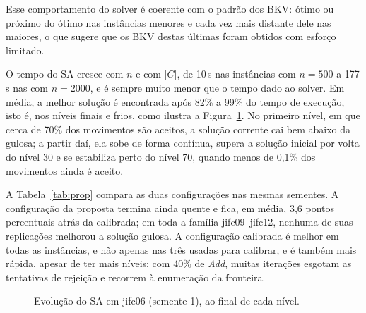 \documentclass[11pt,a4paper]{article}
\begin{document}
Esse comportamento do solver é coerente com o padrão dos BKV: ótimo ou
próximo do ótimo nas instâncias menores e cada vez mais distante dele nas
maiores, o que sugere que os BKV destas últimas foram obtidos com esforço
limitado.

O tempo do SA cresce com $n$ e com $|C|$, de 10\,s nas instâncias com
$n=500$ a 177\,s nas com $n=2000$, e é sempre muito menor que o tempo dado ao
solver. Em média, a melhor solução é encontrada após 82\% a 99\% do tempo de
execução, isto é, nos níveis finais e frios, como ilustra a
Figura~\ref{fig:conv}. No primeiro nível, em que cerca de 70\% dos movimentos
são aceitos, a solução corrente cai bem abaixo da gulosa; a partir daí, ela
sobe de forma contínua, supera a solução inicial por volta do nível 30 e se
estabiliza perto do nível 70, quando menos de 0{,}1\% dos movimentos ainda é
aceito.

A Tabela~\ref{tab:prop} compara as duas configurações nas mesmas sementes.
A configuração da proposta termina ainda quente e fica, em média, 3{,}6 pontos
percentuais atrás da calibrada; em toda a família jifc09--jifc12, nenhuma de
suas replicações melhorou a solução gulosa. A configuração calibrada é melhor
em todas as instâncias, e não apenas nas três usadas para calibrar, e é também
mais rápida, apesar de ter mais níveis: com 40\% de \emph{Add}, muitas
iterações esgotam as tentativas de rejeição e recorrem à enumeração da
fronteira.

\begin{table}[htbp]
  \centering
  \small
  \caption{Configuração da proposta e configuração calibrada (sementes 1 a 5).}
  \label{tab:prop}
  
\end{table}

\begin{figure}[htbp]
  \centering
  \caption{Evolução do SA em jifc06 (semente 1), ao final de cada nível.}
  \label{fig:conv}
\end{figure}
\end{document}
